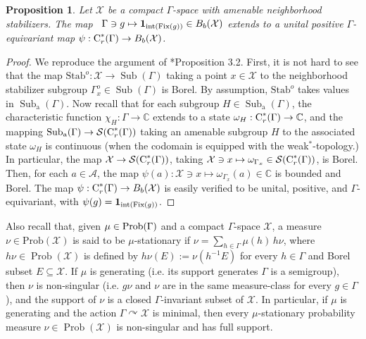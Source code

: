 \documentclass[12pt]{amsart}
\newtheorem{prop}[theorem]{Proposition}
\theoremstyle{definition}
\theoremstyle{remark}
\newcommand{\pr}{\operatorname{Prob}}
\newcommand{\act}{\curvearrowright}
\newcommand{\om}{\omega}
\newcommand{\Sub}{\operatorname{Sub}}
\newcommand{\C}{\mathbb C}
\newcommand{\G}{\Gamma}
\begin{document}
\begin{prop}\label{scarparo}
Let $\mathcal{X}$ be a compact $\Gamma$-space with amenable neighborhood stabilizers.
The map \,
$
\Gamma\ni g\mapsto \textup{\textbf{1}}_{{\rm int}(\textup{Fix}(g))}\in B_b(\mathcal{X})
$
extends to a unital positive $\Gamma$-equivariant map $\psi: \textup{C}^*_r(\Gamma)\to B_b(\mathcal{X})$.
\end{prop}
\begin{proof}
We reproduce the argument of \cite{Ken15}*{Proposition 3.2}. 
First, it is not hard to see that the map $\text{Stab}^o: \mathcal{X}\to \Sub(\Gamma)$ taking a point $x\in\mathcal{X}$ to the neighborhood stabilizer subgroup $\Gamma_x^o\in \Sub(\Gamma)$ is Borel.  
By assumption, $\text{Stab}^o$ takes values in $\Sub_\text{a}(\Gamma)$. Now recall that for each subgroup $H\in \Sub_\text{a}(\Gamma)$, the characteristic function $\chi_H: \Gamma\to \C$ extends to a state $\om_H: \textup{C}^*_r(\Gamma)\to \C$, and the mapping $\Sub_\text{a}(\Gamma)\to \mathcal{S}(\textup{C}^*_r(\Gamma))$ taking an amenable subgroup $H$ to the associated state $\om_H$ is continuous (when the codomain is equipped with the weak$^*$-topology.) In particular, the map $\mathcal{X}\to \mathcal{S}(\textup{C}^*_r(\Gamma))$, taking $\mathcal{X}\ni x\mapsto \om_{\Gamma_x}\in \mathcal{S}(\textup{C}^*_r(\Gamma))$, is Borel. Then, for each $a\in\mathcal{A}$, the map ${\psi}(a):\mathcal{X}\ni x\mapsto \om_{\Gamma_x}(a)\in\mathbb{C}$ is bounded  and Borel. The map $\psi : \textup{C}^*_r(\Gamma)\to B_b(\mathcal{X})$ is easily verified to be unital, positive, and $\Gamma$-equivariant, with $\psi(g) =  \textup{\textbf{1}}_{{\rm int}(\textup{Fix}(g))}$.
\end{proof}


Also recall that, given  $\mu\in\textup{Prob}(\Gamma)$ and a compact $\Gamma$-space $\mathcal{X}$, a measure $\nu\in \text{Prob}(\mathcal{X})$ is said to be $\mu$-stationary if $\nu = \sum_{h\in\Gamma}\mu(h)\,h \nu$, where $h\nu\in \pr(\mathcal{X})$ is defined by $h\nu(E):=\nu(h^{-1}E)$ for every $h\in \G$ and Borel subset $E\subseteq \mathcal{X}$. If $\mu$ is generating (i.e. its support generates $\G$ is a semigroup), then $\nu$ is non-singular (i.e. $g\nu$ and $\nu$ are in the same measure-class for every $g\in\G$), and the support of $\nu$ is a closed $\G$-invariant subset of $\mathcal{X}$. In particular, if $\mu$ is generating and the action $\G\act \mathcal{X}$ is minimal, then every $\mu$-stationary probability measure $\nu\in \pr(\mathcal{X})$ is non-singular and has full support. 
\end{document}
